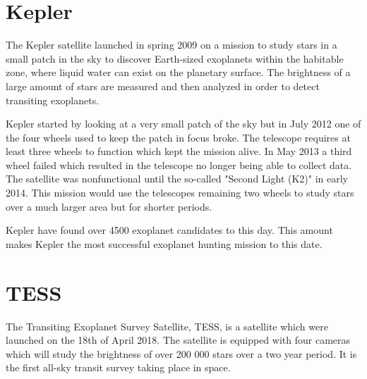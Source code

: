 \documentclass[12pt]{report}
\begin{document}
\section{Kepler}
	The Kepler satellite launched in spring 2009 on a mission to study stars in a small patch in the sky to discover Earth-sized exoplanets within the habitable zone, where liquid water can exist on the planetary surface. The brightness of a large amount of stars are measured and then analyzed in order to detect transiting exoplanets. 
	
	Kepler started by looking at a very small patch of the sky but in July 2012 one of the four wheels used to keep the patch in focus broke. The telescope requires at least three wheels to function which kept the mission alive. In May 2013 a third wheel failed which resulted in the telescope no longer being able to collect data. The satellite was nonfunctional until the so-called "Second Light (K2)" in early 2014. This mission would use the telescopes remaining two wheels to study stars over a much larger area but for shorter periods. \citep{2017PAPhS.161...38B}
	
	Kepler have found over 4500 exoplanet candidates \citep{2017PAPhS.161...38B} to this day. This amount makes Kepler the most successful exoplanet hunting mission to this date.
	
	
\section{TESS}
	The Transiting Exoplanet Survey Satellite, TESS, is a satellite which were launched on the 18th of April 2018. The satellite is equipped with four cameras which will study the brightness of over 200 000 stars over a two year period. It is the first all-sky transit survey taking place in space. \citep{2014SPIE.9143E..20R}
	
\end{document}

